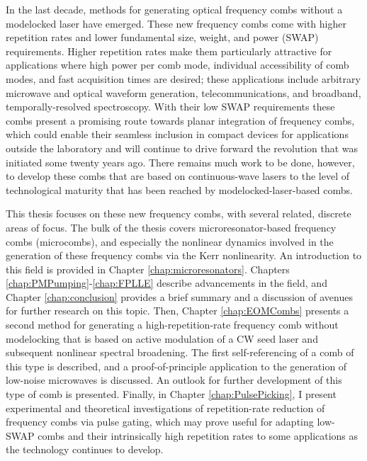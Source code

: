 In the last decade, methods for generating optical frequency combs without a modelocked laser have emerged. These new frequency combs come with higher repetition rates and lower fundamental size, weight, and power (SWAP) requirements. Higher repetition rates make them particularly attractive for applications where high power per comb mode, individual accessibility of comb modes, and fast acquisition times are desired; these applications include arbitrary microwave and optical waveform generation, telecommunications, and broadband, temporally-resolved spectroscopy. With their low SWAP requirements these combs present a promising route towards planar integration of frequency combs, which could enable their seamless inclusion in compact devices for applications outside the laboratory and will continue to drive forward the revolution that was initiated some twenty years ago. There remains much work to be done, however, to develop these combs that are based on continuous-wave lasers to the level of technological maturity that has been reached by modelocked-laser-based combs.




This thesis focuses on these new frequency combs, with several related, discrete areas of focus. The bulk of the thesis covers microresonator-based frequency combs (microcombs), and especially the nonlinear dynamics involved in the generation of these frequency combs via the Kerr nonlinearity. An introduction to this field is provided in Chapter \ref{chap:microresonators}. Chapters \ref{chap:PMPumping}-\ref{chap:FPLLE} describe advancements in the field, and Chapter \ref{chap:conclusion} provides a brief summary and a discussion of avenues for further research on this topic. Then, Chapter \ref{chap:EOMCombs} presents a second method for generating a high-repetition-rate frequency comb without modelocking that is based on active modulation of a CW seed laser and subsequent nonlinear spectral broadening. The first self-referencing of a comb of this type is described, and a proof-of-principle application to the generation of low-noise microwaves is discussed. An outlook for further development of this type of comb is presented. Finally, in Chapter \ref{chap:PulsePicking}, I present experimental and theoretical investigations of repetition-rate reduction of frequency combs via pulse gating, which may prove useful for adapting low-SWAP combs and their intrinsically high repetition rates to some applications as the technology continues to develop. 

